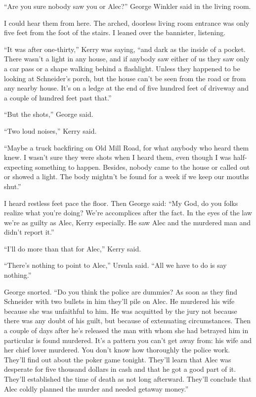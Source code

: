 \documentclass{novel}
\begin{document}
{“Are you sure nobody saw you or Alec?” George Winkler said in the living room.

I could hear them from here. The arched, doorless living room entrance was only five feet from the foot of the stairs. I leaned over the bannister, listening.

“It was after one-thirty,” Kerry was saying, “and dark as the inside of a pocket. There wasn’t a light in any house, and if anybody saw either of us they saw only a car pass or a shape walking behind a flashlight. Unless they happened to be looking at Schneider’s porch, but the house can’t be seen from the road or from any nearby house. It’s on a ledge at the end of five hundred feet of driveway and a couple of hundred feet past that.”

“But the shots,” George said.

“Two loud noises,” Kerry said.

“Maybe a truck backfiring on Old Mill Road, for what anybody who heard them knew. I wasn’t sure they were shots when I heard them, even though I was half-expecting something to happen. Besides, nobody came to the house or called out or showed a light. The body mightn’t be found for a week if we keep our mouths shut.”

I heard restless feet pace the floor. Then George said: “My God, do you folks realize what you’re doing? We’re accomplices after the fact. In the eyes of the law we’re as guilty as Alec, Kerry especially. He saw Alec and the murdered man and didn’t report it.”

“I’ll do more than that for Alec,” Kerry said.

“There’s nothing to point to Alec,” Ursula said. “All we have to do is say nothing.”

George snorted. “Do you think the police are dummies? As soon as they find Schneider with two bullets in him they’ll pile on Alec. He murdered his wife because she was unfaithful to him. He was acquitted by the jury not because there was any doubt of his guilt, but because of extenuating circumstances. Then a couple of days after he’s released the man with whom she had betrayed him in particular is found murdered. It’s a pattern you can’t get away from: his wife and her chief lover murdered. You don’t know how thoroughly the police work. They’ll find out about the poker game tonight. They’ll learn that Alec was desperate for five thousand dollars in cash and that he got a good part of it. They’ll established the time of death as not long afterward. They’ll conclude that Alec coldly planned the murder and needed getaway money.”

}
\end{document}
